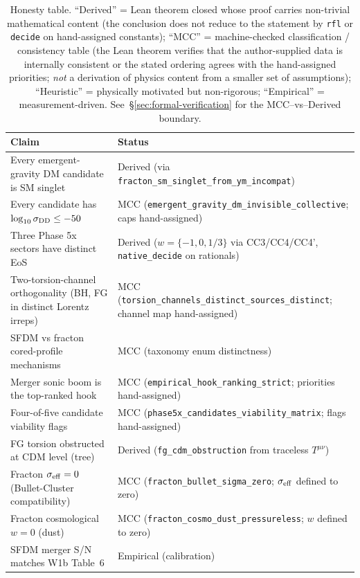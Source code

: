 \documentclass[aps,prd,twocolumn,showpacs,superscriptaddress,nofootinbib]{revtex4-2}
\begin{document}
\begin{table}[ht]
\centering
\caption{\label{tab:honesty}Honesty table. ``Derived'' = Lean theorem
closed whose proof carries non-trivial mathematical content (the
conclusion does not reduce to the statement by \texttt{rfl} or
\texttt{decide} on hand-assigned constants); ``MCC'' = machine-checked
classification / consistency table (the Lean theorem verifies that the
author-supplied data is internally consistent or the stated ordering
agrees with the hand-assigned priorities; \emph{not} a derivation of
physics content from a smaller set of assumptions); ``Heuristic'' =
physically motivated but non-rigorous; ``Empirical'' =
measurement-driven. See~\S\ref{sec:formal-verification} for the
MCC--vs--Derived boundary.}
\begin{tabular}{@{}ll@{}}
\toprule
Claim & Status \\
\midrule
Every emergent-gravity DM candidate is SM singlet
  & Derived (via \texttt{fracton\_sm\_singlet\_from\_ym\_incompat}) \\
Every candidate has $\log_{10}\sigma_{\rm DD} \leq -50$
  & MCC (\texttt{emergent\_gravity\_dm\_invisible\_collective}; caps hand-assigned) \\
Three Phase 5x sectors have distinct EoS
  & Derived ($w = \{-1, 0, 1/3\}$ via CC3/CC4/CC4', \texttt{native\_decide} on rationals) \\
Two-torsion-channel orthogonality (BH, FG in distinct Lorentz irreps)
  & MCC (\texttt{torsion\_channels\_distinct\_sources\_distinct}; channel map hand-assigned) \\
SFDM vs fracton cored-profile mechanisms
  & MCC (taxonomy enum distinctness) \\
Merger sonic boom is the top-ranked hook
  & MCC (\texttt{empirical\_hook\_ranking\_strict}; priorities hand-assigned) \\
Four-of-five candidate viability flags
  & MCC (\texttt{phase5x\_candidates\_viability\_matrix}; flags hand-assigned) \\
FG torsion obstructed at CDM level (tree)
  & Derived (\texttt{fg\_cdm\_obstruction} from traceless $T^{\mu\nu}$) \\
Fracton $\sigma_{\rm eff}=0$ (Bullet-Cluster compatibility)
  & MCC (\texttt{fracton\_bullet\_sigma\_zero}; $\sigma_{\rm eff}$ defined to zero) \\
Fracton cosmological $w=0$ (dust)
  & MCC (\texttt{fracton\_cosmo\_dust\_pressureless}; $w$ defined to zero) \\
SFDM merger S/N matches W1b Table~6 & Empirical (calibration) \\

\end{tabular}
\end{table}
\end{document}
